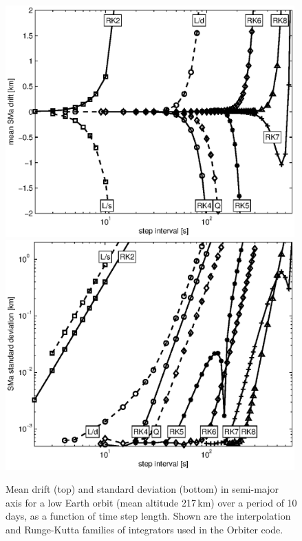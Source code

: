 \documentclass[Orbiter Technical Reference.tex]{subfiles}
\begin{document}
\begin{figure}[H]\centering
\includegraphics[width=0.99\textwidth]{sma_dev}\\
\includegraphics[width=0.99\textwidth]{sma_std}
\caption{Mean drift (top) and standard deviation (bottom) in semi-major axis for a low Earth orbit (mean altitude 217\,km) over a period of 10 days, as a function of time step length. Shown are the interpolation and Runge-Kutta families of integrators used in the Orbiter code.}
\label{fig:1day_err}
\end{figure}
\end{document}
